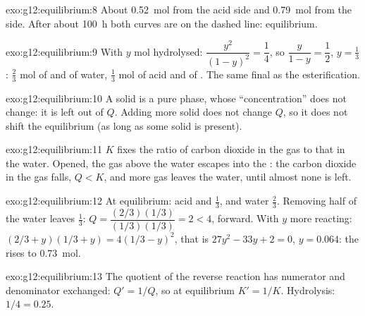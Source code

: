\begin{solution}{exo:g12:equilibrium:8}
About \qty{0.52}{mol} from the acid side and \qty{0.79}{mol} from the
 side. After about \qty{100}{h} both curves are on the dashed line:
equilibrium.
\end{solution}

\begin{solution}{exo:g12:equilibrium:9}
With $y$ mol hydrolysed: $\dfrac{y^2}{(1-y)^2} = \dfrac{1}{4}$, so
$\dfrac{y}{1-y} = \dfrac{1}{2}$, $y = \frac{1}{3}$: $\frac{2}{3}$ mol of
 and of water, $\frac{1}{3}$ mol of acid and of . The same
final  as the esterification.
\end{solution}

\begin{solution}{exo:g12:equilibrium:10}
A solid is a pure phase, whose ``concentration'' does not change: it is
left out of $Q$. Adding more solid does not change $Q$, so it does not
shift the equilibrium (as long as some solid is present).
\end{solution}

\begin{solution}{exo:g12:equilibrium:11}
$K$ fixes the ratio of carbon dioxide in the gas to that in the water.
Opened, the gas above the water escapes into the : the carbon dioxide
in the gas falls, $Q < K$, and more gas leaves the water, until almost
none is left.
\end{solution}

\begin{solution}{exo:g12:equilibrium:12}
At equilibrium: acid and  $\frac{1}{3}$,  and water
$\frac{2}{3}$. Removing half of the water leaves $\frac{1}{3}$:
$Q = \dfrac{(2/3)(1/3)}{(1/3)(1/3)} = 2 < 4$, forward. With $y$ more
reacting: $(2/3 + y)(1/3 + y) = 4(1/3 - y)^2$, that is
$27y^2 - 33y + 2 = 0$, $y = 0.064$: the  rises to \qty{0.73}{mol}.
\end{solution}

\begin{solution}{exo:g12:equilibrium:13}
The quotient of the reverse reaction has numerator and denominator
exchanged: $Q' = 1/Q$, so at equilibrium $K' = 1/K$. Hydrolysis:
$1/4 = 0.25$.
\end{solution}


